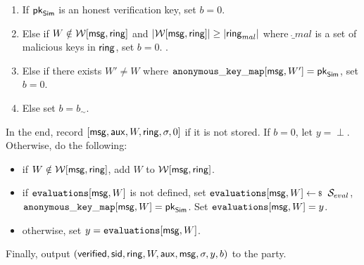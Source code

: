 \begin{tcolorbox}[left=2pt,right=2pt]
\begin{list}{\hspace*{1pt} C}{\setlength\leftmargin{0.15in}}
			\begin{enumerate}
				\item If   $ \mathsf{pk}_{\mathsf{Sim}} $ is an honest verification key, set $ b = 0 $.
				
				\item Else if $ W \notin \mathcal{W}[\mathsf{msg},\mathsf{ring}] $ and $ |\mathcal{W}[\mathsf{msg}, \mathsf{ring}]| \geq |\mathsf{ring}_{mal}| $ where $ \ring_{mal} $ is a set of malicious keys in $ \mathsf{ring} $, set $ b = 0 $.
				\label{cond:uniqueness}.
				
				\item Else if there exists $ W' \neq W $ where  $ \mathtt{anonymous\_key\_map}[\mathsf{msg},W'] = \mathsf{pk}_{\mathsf{Sim}} $, set $ b = 0 $. \label{cond:differentWforsamepk} 
				\item Else set $ b = b_\sim$. \label{cond:simulatorbit}
			\end{enumerate}		
			
		\end{list}
		In the end,  record $ [\mathsf{msg},\mathsf{aux},W,\mathsf{ring},\sigma, 0] $ if it is not stored. If $ b = 0 $, let $y = \perp $. Otherwise,   do the following:
		\begin{itemize}
			\item if $ W \notin \mathcal{W}[\mathsf{msg},\mathsf{ring}] $, add $ W $ to $ \mathcal{W}[\mathsf{msg},\mathsf{ring}]  $.
			\item if $ \texttt{evaluations}[\mathsf{msg},W] $ is not defined, set $ \evaluationslist[\msg, W]\leftsample \setsym{S}_{eval}$, $ \mathtt{anonymous\_key\_map}[\mathsf{msg},W]  = \mathsf{pk}_{\mathsf{Sim}}$.  Set $ \texttt{evaluations}[\mathsf{msg}, W] = y$.
			\item otherwise, set $ y = \texttt{evaluations}[\mathsf{msg}, W]$. 	
		\end{itemize}
		Finally, output $(\mathsf{verified}, \textsf{sid}, \mathsf{ring},W, \mathsf{aux},\mathsf{msg}, \sigma, y, b)$ to the party.
		
	\end{tcolorbox}
	
